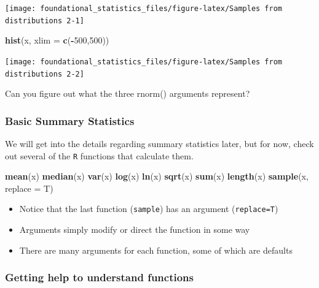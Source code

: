 \documentclass[]{book}
\newenvironment{Shaded}{\begin{snugshade}}{\end{snugshade}}
\newcommand{\DataTypeTok}[1]{\textcolor[rgb]{0.13,0.29,0.53}{#1}}
\newcommand{\DecValTok}[1]{\textcolor[rgb]{0.00,0.00,0.81}{#1}}
\newcommand{\KeywordTok}[1]{\textcolor[rgb]{0.13,0.29,0.53}{\textbf{#1}}}
\newcommand{\NormalTok}[1]{#1}
\newcommand{\OperatorTok}[1]{\textcolor[rgb]{0.81,0.36,0.00}{\textbf{#1}}}
\begin{document}
\texttt{[image: foundational\_statistics\_files/figure-latex/Samples from distributions 2-1]}

\begin{Shaded}
\begin{Highlighting}[]
\KeywordTok{hist}\NormalTok{(x, }\DataTypeTok{xlim =} \KeywordTok{c}\NormalTok{(}\OperatorTok{-}\DecValTok{500}\NormalTok{,}\DecValTok{500}\NormalTok{))}
\end{Highlighting}
\end{Shaded}

\texttt{[image: foundational\_statistics\_files/figure-latex/Samples from distributions 2-2]}

Can you figure out what the three rnorm() arguments represent?

\hypertarget{basic-summary-statistics}{%
\subsubsection{Basic Summary Statistics}\label{basic-summary-statistics}}

We will get into the details regarding summary statistics later, but for now, check out several of the \texttt{R} functions that calculate them.

\begin{Shaded}
\begin{Highlighting}[]
\KeywordTok{mean}\NormalTok{(x)}
\KeywordTok{median}\NormalTok{(x)}
\KeywordTok{var}\NormalTok{(x)}
\KeywordTok{log}\NormalTok{(x)}
\KeywordTok{ln}\NormalTok{(x)}
\KeywordTok{sqrt}\NormalTok{(x)}
\KeywordTok{sum}\NormalTok{(x)}
\KeywordTok{length}\NormalTok{(x)}
\KeywordTok{sample}\NormalTok{(x, }\DataTypeTok{replace =}\NormalTok{ T)}
\end{Highlighting}
\end{Shaded}

\begin{itemize}
\item
  Notice that the last function (\texttt{sample}) has an argument (\texttt{replace=T})
\item
  Arguments simply modify or direct the function in some way
\item
  There are many arguments for each function, some of which are defaults
\end{itemize}

\hypertarget{getting-help-to-understand-functions}{%
\subsubsection{Getting help to understand functions}\label{getting-help-to-understand-functions}}
\end{document}
